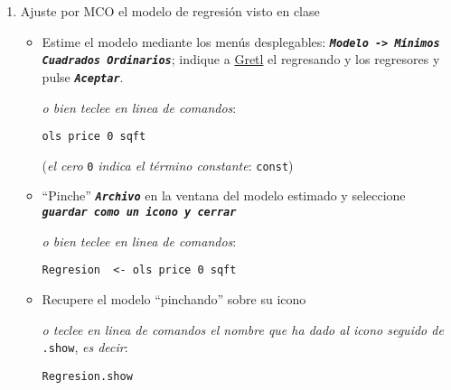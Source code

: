 \documentclass[11pt]{article}
\begin{document}
\begin{enumerate}
\item Ajuste por MCO el modelo de regresión visto en clase
\label{sec:org2b28d1b}
\begin{itemize}
\item Estime el modelo mediante los menús desplegables: \textbf{\emph{\texttt{Modelo ->
  Mínimos Cuadrados Ordinarios}}}; indique a \href{https://gretl.sourceforge.net/es.html}{Gretl} el regresando y los
regresores y pulse \textbf{\emph{\texttt{Aceptar}}}.

{\vspace{1pt} \footnotesize \color{gray!70!black} \color{gray!70!black}
\emph{o bien teclee en linea de comandos}:
\begin{verbatim}
ols price 0 sqft
\end{verbatim}
(\emph{el cero} \texttt{0} \emph{indica el término constante}: \texttt{const})
}

\item ``Pinche'' \textbf{\emph{\texttt{Archivo}}} en la ventana del modelo estimado y
seleccione \textbf{\emph{\texttt{guardar como un icono y cerrar}}}

{\vspace{1pt} \footnotesize \color{gray!70!black} \color{gray!70!black}
\emph{o bien teclee en linea de comandos}:
\begin{verbatim}
Regresion  <- ols price 0 sqft
\end{verbatim}
}

\item Recupere el modelo ``pinchando'' sobre su icono

{\vspace{1pt} \footnotesize \color{gray!70!black} \color{gray!70!black}
\emph{o teclee en linea de comandos el nombre que ha dado al icono
  seguido de} \texttt{.show}, \emph{es decir}:
\begin{verbatim}
Regresion.show
\end{verbatim}
}
\end{itemize}
\end{enumerate}
\end{document}
